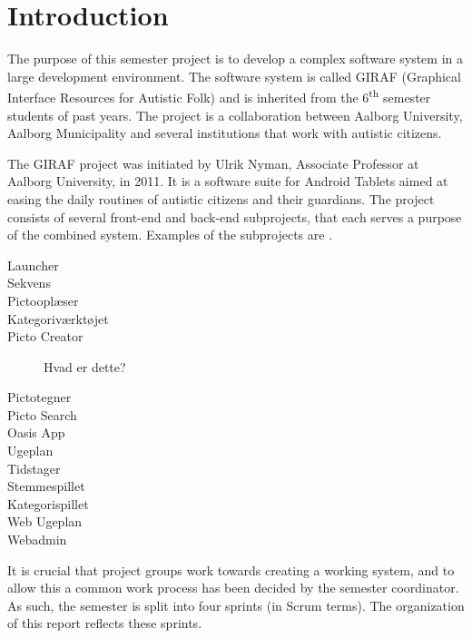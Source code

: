 \chapter{Introduction}

The purpose of this semester project is to develop a complex software system in a large development environment. The software system is called GIRAF (Graphical Interface Resources for Autistic Folk) and is inherited from the 6\textsuperscript{th} semester students of past years. The project is a collaboration between Aalborg University, Aalborg Municipality and several institutions that work with autistic citizens. 

The GIRAF project was initiated by Ulrik Nyman, Associate Professor at Aalborg University, in 2011. It is a software suite for Android Tablets aimed at easing the daily routines of autistic citizens and their guardians. The project consists of several front-end and back-end subprojects, that each serves a purpose of the combined system. Examples of the subprojects are .

\begin{description}
  \item[Launcher] \dummy
  \item[Sekvens]
  \item[Pictooplæser]
	\item[Kategoriværktøjet] \dummy
  \item[Picto Creator] Hvad er dette?
  \item[Pictotegner]
  \item[Picto Search] \dummy
  \item[Oasis App]
  \item[Ugeplan]
  \item[Tidstager] 
  \item[Stemmespillet]
  \item[Kategorispillet]
  \item[Web Ugeplan]
  \item[Webadmin]
\end{description}

It is crucial that project groups work towards creating a working system, and to allow this a common work process has been decided by the semester coordinator. As such, the semester is split into four sprints (in Scrum terms). The organization of this report reflects these sprints. 

